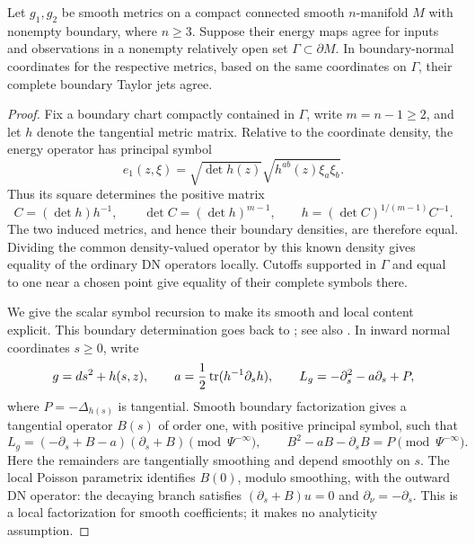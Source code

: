 \begin{lemma}\label{data:jets}
Let $g_1,g_2$ be smooth metrics on a compact connected smooth
$n$-manifold $M$ with nonempty boundary, where $n\ge3$. Suppose their
energy maps agree for inputs and observations in a nonempty relatively
open set $\Gamma\subset\partial M$. In boundary-normal coordinates
for the respective metrics, based on the same coordinates on
$\Gamma$, their complete boundary Taylor jets agree.
\end{lemma}

\begin{proof}
Fix a boundary chart compactly contained in $\Gamma$, write
$m=n-1\ge2$, and let $h$ denote the tangential metric matrix.
Relative to the coordinate density, the energy operator has principal
symbol
\[
 e_1(z,\xi)=\sqrt{\det h(z)}
             \sqrt{h^{ab}(z)\xi_a\xi_b}.
\]
Thus its square determines the positive matrix
\[
 C=(\det h)h^{-1},\qquad
 \det C=(\det h)^{m-1},\qquad
 h=(\det C)^{1/(m-1)}C^{-1}.
\]
The two induced metrics, and hence their boundary densities, are
therefore equal. Dividing the common density-valued operator by this
known density gives equality of the ordinary DN operators locally.
Cutoffs supported in $\Gamma$ and equal to one near a chosen point
give equality of their complete symbols there.

We give the scalar symbol recursion to make its smooth and local
content explicit. This boundary determination goes back to
\citet{LeeUhlmann1989}; see also
\citet[Theorem~1.1(ii) and Proposition~3.1]{JoshiLionheart2005}.
In inward normal coordinates $s\ge0$, write
\[
 g=ds^2+h(s,z),\qquad
 a=\frac12\operatorname{tr}(h^{-1}\partial_s h),\qquad
 L_g=-\partial_s^2-a\partial_s+P,
\]
where $P=-\Delta_{h(s)}$ is tangential. Smooth boundary factorization
gives a tangential operator $B(s)$ of order one, with positive
principal symbol, such that
\begin{equation}\label{data:factorization}
 L_g=(-\partial_s+B-a)(\partial_s+B)
          \pmod{\Psi^{-\infty}},\qquad
 B^2-aB-\partial_sB=P\pmod{\Psi^{-\infty}}.
\end{equation}
Here the remainders are tangentially smoothing and depend smoothly on
$s$. The local Poisson parametrix identifies $B(0)$, modulo smoothing,
with the outward DN operator: the decaying branch satisfies
$(\partial_s+B)u=0$ and $\partial_\nu=-\partial_s$.
This is a local factorization for smooth coefficients; it makes no
analyticity assumption.


\end{proof}
